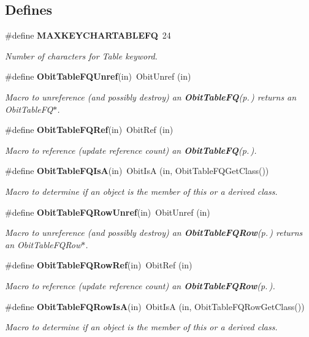 \subsection*{Defines}
\begin{CompactItemize}
\item 
\#define {\bf MAXKEYCHARTABLEFQ}\ 24
\begin{CompactList}\small\item\em Number of characters for Table keyword. \item\end{CompactList}\item 
\#define {\bf Obit\-Table\-FQUnref}(in)\ Obit\-Unref (in)
\begin{CompactList}\small\item\em Macro to unreference (and possibly destroy) an {\bf Obit\-Table\-FQ}{\rm (p.\,\pageref{structObitTableFQ})} returns an Obit\-Table\-FQ$\ast$. \item\end{CompactList}\item 
\#define {\bf Obit\-Table\-FQRef}(in)\ Obit\-Ref (in)
\begin{CompactList}\small\item\em Macro to reference (update reference count) an {\bf Obit\-Table\-FQ}{\rm (p.\,\pageref{structObitTableFQ})}. \item\end{CompactList}\item 
\#define {\bf Obit\-Table\-FQIs\-A}(in)\ Obit\-Is\-A (in, Obit\-Table\-FQGet\-Class())
\begin{CompactList}\small\item\em Macro to determine if an object is the member of this or a derived class. \item\end{CompactList}\item 
\#define {\bf Obit\-Table\-FQRow\-Unref}(in)\ Obit\-Unref (in)
\begin{CompactList}\small\item\em Macro to unreference (and possibly destroy) an {\bf Obit\-Table\-FQRow}{\rm (p.\,\pageref{structObitTableFQRow})} returns an Obit\-Table\-FQRow$\ast$. \item\end{CompactList}\item 
\#define {\bf Obit\-Table\-FQRow\-Ref}(in)\ Obit\-Ref (in)
\begin{CompactList}\small\item\em Macro to reference (update reference count) an {\bf Obit\-Table\-FQRow}{\rm (p.\,\pageref{structObitTableFQRow})}. \item\end{CompactList}\item 
\#define {\bf Obit\-Table\-FQRow\-Is\-A}(in)\ Obit\-Is\-A (in, Obit\-Table\-FQRow\-Get\-Class())
\begin{CompactList}\small\item\em Macro to determine if an object is the member of this or a derived class. \item\end{CompactList}\end{CompactItemize}
